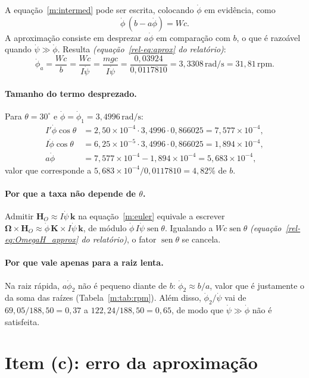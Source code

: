 \documentclass[11pt,a4paper]{article}
\newcommand{\vet}[1]{\mathbf{#1}}
\newcommand{\vOmega}{\boldsymbol{\Omega}}
\newcommand{\seno}{\operatorname{sen}}
\newcommand{\un}[1]{\,\mathrm{#1}}
\newcommand{\phid}{\dot{\phi}}
\newcommand{\psid}{\dot{\psi}}
\newcommand{\rel}[1]{\textit{(equação~\ref*{rel-eq:#1} do relatório)}}
\begin{document}
A equação~\ref{m:intermed} pode ser escrita, colocando $\phid$ em evidência, como
\begin{equation}
\phid\,\left(b-a\phid\right)=Wc.\label{m:bafi}
\end{equation}
A aproximação consiste em desprezar $a\phid$ em comparação com $b$, o que é razoável quando $\psid\gg\phid$. Resulta \rel{aprox}:
\begin{equation}
\phid_a=\frac{Wc}{b}=\frac{Wc}{I\psid}=\frac{mgc}{I\psid}=\frac{0,03924}{0,0117810}=3,3308\un{rad/s}=31,81\un{rpm}.
\end{equation}

\paragraph{Tamanho do termo desprezado.} Para $\theta=30^\circ$ e $\phid=\phid_1=3,4996\un{rad/s}$:
\begin{align}
I'\phid\cos\theta&=2,50\times10^{-4}\cdot3,4996\cdot0,866025=7,577\times10^{-4},\\
I\phid\cos\theta&=6,25\times10^{-5}\cdot3,4996\cdot0,866025=1,894\times10^{-4},\\
a\phid&=7,577\times10^{-4}-1,894\times10^{-4}=5,683\times10^{-4},
\end{align}
valor que corresponde a $5,683\times10^{-4}/0,0117810=4,82\%$ de $b$.

\paragraph{Por que a taxa não depende de $\theta$.} Admitir $\vet{H}_O\approx I\psid\,\vet{k}$ na equação~\ref{m:euler} equivale a escrever $\vOmega\times\vet{H}_O\approx\phid\,\vet{K}\times I\psid\,\vet{k}$, de módulo $\phid\,I\psid\seno\theta$. Igualando a $Wc\seno\theta$ \rel{OmegaH_approx}, o fator $\seno\theta$ se cancela.

\paragraph{Por que vale apenas para a raiz lenta.} Na raiz rápida, $a\phid_2$ não é pequeno diante de $b$: $\phid_2\approx b/a$, valor que é justamente o da soma das raízes (Tabela~\ref{m:tab:rpm}). Além disso, $\phid_2/\psid$ vai de $69,05/188,50=0,37$ a $122,24/188,50=0,65$, de modo que $\psid\gg\phid$ não é satisfeita.

\section{Item (c): erro da aproximação}
\end{document}
